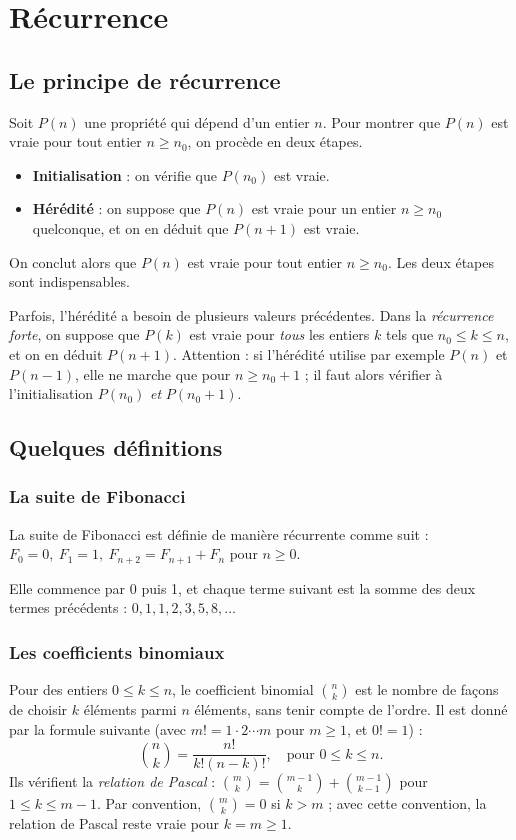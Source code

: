 \chapter{Récurrence}
\section*{Le principe de récurrence}
Soit \(P(n)\) une propriété qui dépend d'un entier \(n\). Pour montrer que \(P(n)\) est vraie pour tout entier \(n \geq n_0\), on procède en deux étapes.
\begin{itemize}
    \item \textbf{Initialisation} : on vérifie que \(P(n_0)\) est vraie.
    \item \textbf{Hérédité} : on suppose que \(P(n)\) est vraie pour un entier \(n \geq n_0\) quelconque, et on en déduit que \(P(n+1)\) est vraie.
\end{itemize}
On conclut alors que \(P(n)\) est vraie pour tout entier \(n \geq n_0\). Les deux étapes sont indispensables.

Parfois, l'hérédité a besoin de plusieurs valeurs précédentes. Dans la \emph{récurrence forte}, on suppose que \(P(k)\) est vraie pour \emph{tous} les entiers \(k\) tels que \(n_0 \leq k \leq n\), et on en déduit \(P(n+1)\). Attention : si l'hérédité utilise par exemple \(P(n)\) et \(P(n-1)\), elle ne marche que pour \(n \geq n_0 + 1\) ; il faut alors vérifier à l'initialisation \(P(n_0)\) \emph{et} \(P(n_0+1)\).

\section*{Quelques définitions}
    \subsection*{La suite de Fibonacci}
        La suite de Fibonacci est définie de manière récurrente comme suit :
            \(
                F_0 = 0, \ F_1 = 1, \ F_{n+2} = F_{n+1} + F_n \text{ pour } n \geq 0.
            \)

        Elle commence par 0 puis 1, et chaque terme suivant est la somme des deux termes précédents :
            \(0, 1, 1, 2, 3, 5, 8, \ldots\)
\subsection*{Les coefficients binomiaux}
    Pour des entiers \(0 \leq k \leq n\), le coefficient binomial \(\displaystyle \binom{n}{k}\) est le nombre de façons de choisir \(k\) éléments parmi \(n\) éléments, sans tenir compte de l'ordre. Il est donné par la formule suivante (avec \(m! = 1 \cdot 2 \cdots m\) pour \(m \geq 1\), et \(0! = 1\)) :
    \[
        \binom{n}{k} = \frac{n!}{k!(n-k)!}, \quad \text{pour } 0 \leq k \leq n.
    \]
    Ils vérifient la \emph{relation de Pascal} : \(\displaystyle\binom{m}{k} = \binom{m-1}{k} + \binom{m-1}{k-1}\) pour \(1 \leq k \leq m-1\). Par convention, \(\binom{m}{k} = 0\) si \(k > m\) ; avec cette convention, la relation de Pascal reste vraie pour \(k = m \geq 1\).

